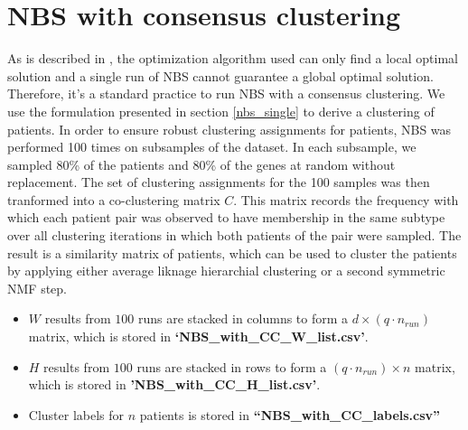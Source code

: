 \documentclass[11pt]{article}
\begin{document}
\section{NBS with consensus clustering}
As is described in \cite{nbs}, the optimization algorithm used can only find a local optimal solution and a single run of NBS cannot guarantee a global optimal solution. Therefore, it's a standard practice to run NBS with a consensus clustering. We use the formulation presented in section \ref{nbs_single} to derive a clustering of patients. In order to ensure robust clustering assignments for patients, NBS was performed 100 times on subsamples of the dataset. In each subsample, we sampled 80\% of the patients and 80\% of the genes at random without replacement. The set of clustering assignments for the 100 samples was then tranformed into a co-clustering matrix $C$. This matrix records the frequency with which each patient pair was observed to have membership in the same subtype over all clustering iterations in which both patients of the pair were sampled. The result is a similarity matrix of patients, which can be used to cluster the patients by applying either average liknage hierarchial clustering or a second symmetric NMF step. 
\begin{itemize}
	\item{$W$ results from $100$ runs are stacked in columns to form a $d\times (q\cdot n_{run})$ matrix, which is stored in \textbf{`NBS\_with\_CC\_W\_list.csv'}}.
	\item{$H$ results from $100$ runs are stacked in rows to form a $(q\cdot n_{run})\times n$} matrix, which is stored in \textbf{'NBS\_with\_CC\_H\_list.csv'}.
	\item{Cluster labels for $n$ patients is stored in \textbf{``NBS\_with\_CC\_labels.csv''}}
\end{itemize}
\end{document}
